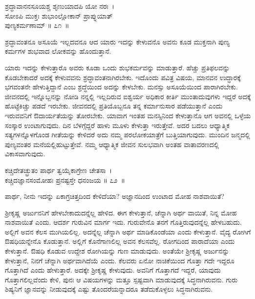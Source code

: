 \begin{shloka}
ಶ್ರದ್ಧಾವಾನನಸೂಯಶ್ಚ ಶೃಣುಯಾದಪಿ ಯೋ ನರಃ~।\\ಸೋಽಪಿ ಮುಕ್ತಃ ಶುಭಾಂಲ್ಲೋಕಾನ್ ಪ್ರಾಪ್ನುಯಾತ್\\ ಪುಣ್ಯಕರ್ಮಣಾಮ್ \hfill॥ ೭೧~॥
\end{shloka}

\begin{artha}
ಶ್ರದ್ಧಾವಂತನೂ ಅಸೂಯೆ ಇಲ್ಲದವನೂ ಆದ ಯಾರು ಇದನ್ನು ಕೇಳುವನೊ ಅವನು ಕೂಡ ಮುಕ್ತನಾಗಿ ಪುಣ್ಯ ಕರ್ಮಗಳ ಶುಭವಾದ ಲೋಕವನ್ನು ಹೊಂದುತ್ತಾನೆ.
\end{artha}

ಯಾರು ಇದನ್ನು ಕೇಳುತ್ತಾರೊ ಅವರು ಕೂಡಾ ಒಂದು ಶುಭಕರ್ಮವನ್ನು ಮಾಡುತ್ತಾರೆ. ಹೆಚ್ಚು ಪ್ರತಿಫಲವನ್ನು ಕೊಡಬೇಕಾದರೆ ಅದಕ್ಕೆ ಕೇಳುವವನು ಶ್ರದ್ಧಾವಂತನಾಗಿರಬೇಕು. ಇದೊಂದು ಪವಿತ್ರ ವಿಷಯ, ಮಾನವನ ಉದ್ಧಾರಕ್ಕೆ ಭಗವಂತನೇ ಹೇಳುತ್ತಿದ್ದಾನೆ ಎಂಬ ಶ್ರದ್ಧೆಯಿಂದ ಅದನ್ನು ಕೇಳಬೇಕು. ಮನಸ್ಸು ಅಸೂಯೆಯಿಂದ ಪಾರಾಗಿರಬೇಕು. ಜೀವನದಲ್ಲಿ ಇನ್ನೊಬ್ಬನನ್ನು ನೋಡಿ ನನ್ನಲ್ಲಿ ಇಲ್ಲದಿರುವ ಐಶ್ವರ್ಯ ಅಧಿಕಾರ ಕೀರ್ತಿ ಮುಂತಾದುವುಗಳು ಇದ್ದರೆ ಅದಕ್ಕೆ ಹೊಟ್ಟೆಕಿಚ್ಚು ಪಡದೆ ಇರಬೇಕು. ಜೀವನದಲ್ಲಿ ಪ್ರತಿಯೊಬ್ಬನೂ ತನ್ನ ಕರ್ಮಾನುಸಾರ ಪಡೆಯುತ್ತಾನೆ ಎಂದು ಇರುವವನಿಗೆ ಔದಾರ್ಯತೆಯನ್ನು ತೋರಬೇಕು. ಯಾವಾಗ ಇಂತಹ ಮನಸ್ಸಿನಿಂದ ಕೇಳುತ್ತಾನೊ ಆಗ ಅವನಲ್ಲಿ ಒಳ್ಳೆಯ ಸಂಸ್ಕಾರ ಉಂಟಾಗುವುದು. ದಿನ ಬೆಳಗ್ಗೆದ್ದರೆ ಹಾಳು ಮೂಳು ಕೇಳುತ್ತಾ ಇರುತ್ತೇವೆ. ಅದರ ಬದಲು ಆಧ್ಯಾತ್ಮಿಕ ಸತ್ಯಗಳನ್ನೊಳಗೊಂಡ ಗೀತೆಯನ್ನು ಕೇಳಿದರೆ ಅದು ನಮ್ಮ ಪರಲೋಕಯಾತ್ರೆಗೆ ಬುತ್ತಿಯಾಗುವುದು. ಮುಂದಿನ ಜನ್ಮದಲ್ಲಿ ಪುಣ್ಯವಂತರ ಮನೆಯಲ್ಲಿ\break ಹುಟ್ಟುತ್ತೇವೆ. ನಮ್ಮ ಆಧ್ಯಾತ್ಮಿಕ ಜೀವನ ಸುಲಭವಾಗಿ ಅಂತಹ ವಾತಾವರಣದಲ್ಲಿ ವಿಕಾಸವಾಗುವುದು.

\begin{shloka}
ಕಚ್ಚಿದೇತಚ್ಛ್ರುತಂ ಪಾರ್ಥ ತ್ವಯೈಕಾಗ್ರೇಣ ಚೇತಸಾ~।\\ಕಚ್ಚಿದಜ್ಞಾನಸಂಮೋಹಃ ಪ್ರನಷ್ಟಸ್ತೇ ಧನಂಜಯ \hfill॥ ೭೨~॥
\end{shloka}

\begin{artha}
ಪಾರ್ಥ, ನೀನು ಇದನ್ನು ಏಕಾಗ್ರಚಿತ್ತದಿಂದ ಕೇಳಿದೆಯಾ? ಅಜ್ಞಾನದಿಂದ ಉಂಟಾದ ಮೋಹ ನಾಶವಾಯಿತೆ?
\end{artha}

ಶ‍್ರೀಕೃಷ್ಣ ಅರ್ಜುನನಿಗೆ ಹೇಳಬೇಕಾದುದನ್ನೆಲ್ಲ ಹೇಳಿದ. ಈಗ ಕೇಳುತ್ತಾನೆ, ಚೆನ್ನಾಗಿ ಅರ್ಥ ವಾಯಿತೆ, ನಿನ್ನ ಮೋಹ ನಾಶವಾಯಿತೆ ಎಂದು. ಆದರ್ಶ ಗುರುವಿನ ಮಾರ್ಗ ಇದು. ಗುರುವೇನೊ ತನಗೆ ಗೊತ್ತಿರುವುದನ್ನೆಲ್ಲ ಹೇಳಬಹುದು. ಅಲ್ಲಿಗೆ ಅವನ ಕೆಲಸ ಮುಗಿಯಲಿಲ್ಲ. ಅದನ್ನೆಲ್ಲ ಚೆನ್ನಾಗಿ ಅರ್ಥ ಮಾಡಿಕೊಂಡೆಯಾ ಎಂದು ಕೇಳುತ್ತಾನೆ. ವೈದ್ಯ ರೋಗಿಗೆ ಔಷಧಿಯನ್ನೇನೊ ಕೊಡುತ್ತಾನೆ. ಅಲ್ಲಿಗೆ ಕೊನೆಗಾಣಲಿಲ್ಲ ಅವನ ಕೆಲಸವೆಲ್ಲ. ರೋಗದಿಂದ ಪಾರಾದೆಯಾ ಎಂದು ಕೇಳುತ್ತಾನೆ. ಔಷಧಿ ಕೊಡುವ ಉದ್ದೇಶ ರೋಗಿಯನ್ನು ಗುಣ ಮಾಡುವುದು. ಅಂತೆಯೇ ಶ‍್ರೀಕೃಷ್ಣ ಅರ್ಜುನನ್ನು ಕೇಳುತ್ತಾನೆ, ನಿನಗೆ ಚೆನ್ನಾಗಿ ಅರ್ಥವಾಗಿದೆಯೆ ಎಂದು. ಕೆಲವರು ಏನೋ ನಾಚಿಕೆಯಿಂದ ಗೊತ್ತಾ ಗದೇ ಇದ್ದರೂ ಗೊತ್ತಾಗಿದೆ ಎಂದು ಹೇಳುತ್ತಾರೆ. ಅದಕ್ಕೇ ಶ‍್ರೀಕೃಷ್ಣ ಕೇಳುವುದು. ಅವನಿಗೆ ಗೊತ್ತಾಗದೆ ಇದ್ದರೆ, ಯಾವುದು ಗೊತ್ತಾಗಲಿಲ್ಲವೆಂದು ಕೇಳಿ, ಪುನಃ ಆ ವಿಷಯಗಳನ್ನು ಮತ್ತೂ ಸ್ಪಷ್ಟವಾಗಿ ಮಾಡುವುದಕ್ಕೆ ಸಿದ್ಧನಾಗಿರುವನು. ಗುರು ಶಿಷ್ಯನಿಗೆ ಜ್ಞಾನವನ್ನು ನೀಡುವುದಕ್ಕೆ ಎಷ್ಟು ತೊಂದರೆಯನ್ನಾದರೂ ತಡೆದುಕೊಳ್ಳಲು ಸಿದ್ಧನಾಗಿರುವನು.

